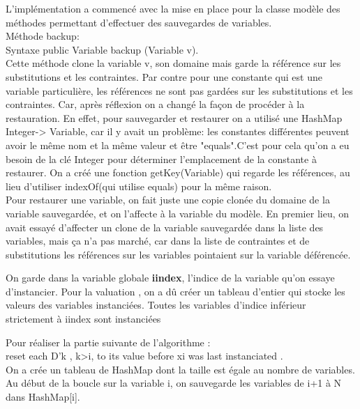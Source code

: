 

L’implémentation a commencé avec la mise en place pour la classe modèle des méthodes permettant d'effectuer des sauvegardes de variables.\\
Méthode backup:\\
Syntaxe public Variable backup (Variable v).\\
Cette méthode clone la variable v, son domaine mais garde la référence sur les substitutions et les contraintes.
Par contre pour  une constante qui est une  variable particulière, les références ne sont pas gardées sur les substitutions et les contraintes.
Car, après réflexion on a changé la façon de procéder à la restauration.
En effet, pour sauvegarder et restaurer on a utilisé une HashMap Integer-> Variable, car il y avait un problème: les constantes différentes peuvent avoir le même nom et la même valeur et être "equals".C'est pour cela qu'on a eu besoin de la clé Integer pour déterminer l'emplacement de la constante à restaurer.
On a créé une fonction getKey(Variable) qui regarde les références, au lieu d'utiliser indexOf(qui utilise equals) pour la même raison.\\
Pour restaurer une variable, on fait juste une copie clonée du domaine de la variable sauvegardée, et on l'affecte à la variable du modèle.
En premier lieu, on avait essayé d'affecter un clone de la variable sauvegardée dans la liste des variables, mais ça n'a pas marché, car dans la liste de contraintes et de substitutions les références sur les variables pointaient sur la variable déférencée.

On garde dans la variable globale \textbf{iindex}, l'indice de la variable qu'on essaye d'instancier.
Pour la valuation , on a dû créer un tableau d'entier qui stocke les valeurs des variables instanciées. Toutes les variables d'indice inférieur strictement à iindex sont instanciées


Pour réaliser la partie suivante de l’algorithme : \\
reset each D'k , k>i, to its value before xi was last instanciated .\\
On a crée un tableau de HashMap dont la taille est égale  au nombre de variables.
Au début de la boucle sur la variable i, on sauvegarde les variables de i+1 à N dans HashMap[i].\\

 
